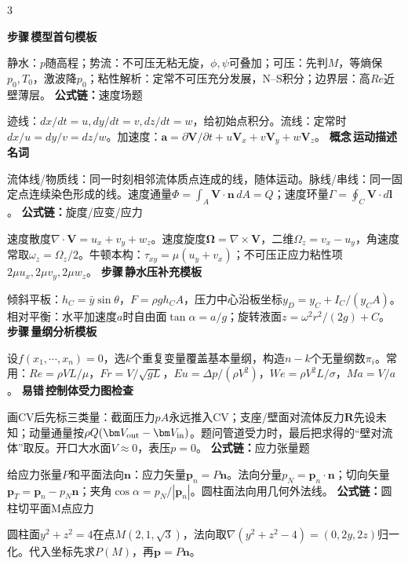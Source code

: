 \documentclass[a4paper]{article}
\newcommand{\form}[1]{{\color{M}\bfseries 公式链：}#1\par}
\newcommand{\labtag}[3]{{\bfseries\color{#1}\colorbox{#1}{\color{white}\fontsize{2.18}{2.28}\selectfont #2}\,#3}\par}
\newcommand{\step}[1]{\labtag{S}{步骤}{#1}}
\newcommand{\err}[1]{\labtag{R}{易错}{#1}}
\newcommand{\concept}[1]{\labtag{V}{概念}{#1}}
\newcommand{\stepq}[1]{\step{#1}}
\newcommand{\formq}[1]{\form{#1}}
\newcommand{\errq}[1]{\err{#1}}
\newcommand{\conceptq}[1]{\concept{#1}}
\newenvironment{vfourWrap}{\par\begingroup\fontsize{2.56}{2.70}\selectfont\setlength{\fboxsep}{0.38pt}}{\par\endgroup}
\begin{document}
\begin{multicols}{3}
\begin{vfourWrap}
\stepq{模型首句模板}
静水：$p$随高程；势流：不可压无粘无旋，$\phi,\psi$可叠加；可压：先判$M$，等熵保$p_0,T_0$，激波降$p_0$；粘性解析：定常不可压充分发展，N--S积分；边界层：高$Re$近壁薄层。
\formq{速度场题}
迹线：$dx/dt=u,dy/dt=v,dz/dt=w$，给初始点积分。流线：定常时$dx/u=dy/v=dz/w$。加速度：$\bm a=\partial\bm V/\partial t+u\bm V_x+v\bm V_y+w\bm V_z$。
\conceptq{运动描述名词}
流体线/物质线：同一时刻相邻流体质点连成的线，随体运动。脉线/串线：同一固定点连续染色形成的线。速度通量$\Phi=\int_A\bm V\cdot\bm n\,dA=Q$；速度环量$\Gamma=\oint_C\bm V\cdot d\bm l$。
\formq{旋度/应变/应力}
速度散度$\nabla\cdot\bm V=u_x+v_y+w_z$。速度旋度$\bm\Omega=\nabla\times\bm V$，二维$\Omega_z=v_x-u_y$，角速度常取$\omega_z=\Omega_z/2$。牛顿本构：$\tau_{xy}=\mu(u_y+v_x)$；不可压正应力粘性项$2\mu u_x,2\mu v_y,2\mu w_z$。
\stepq{静水压补充模板}
倾斜平板：$h_C=\bar y\sin\theta$，$F=\rho gh_CA$，压力中心沿板坐标$y_D=y_C+I_C/(y_CA)$。相对平衡：水平加速度$a$时自由面$\tan\alpha=a/g$；旋转液面$z=\omega^2r^2/(2g)+C$。
\stepq{量纲分析模板}
设$f(x_1,\cdots,x_n)=0$，选$k$个重复变量覆盖基本量纲，构造$n-k$个无量纲数$\pi_i$。常用：$Re=\rho VL/\mu$，$Fr=V/\sqrt{gL}$，$Eu=\Delta p/(\rho V^2)$，$We=\rho V^2L/\sigma$，$Ma=V/a$。
\errq{控制体受力图检查}
画CV后先标三类量：截面压力$pA$永远推入CV；支座/壁面对流体反力$\bm R$先设未知；动量通量按$\rho Q(\bm V_{\rm out}-\bm V_{\rm in})$。题问管道受力时，最后把求得的“壁对流体”取反。开口大水面$V\approx0$，表压$p=0$。
\formq{应力张量题}
给应力张量$P$和平面法向$\bm n$：应力矢量$\bm p_n=P\bm n$。法向分量$p_N=\bm p_n\cdot\bm n$；切向矢量$\bm p_T=\bm p_n-p_N\bm n$；夹角$\cos\alpha=p_N/|\bm p_n|$。圆柱面法向用几何外法线。
\formq{圆柱切平面M点应力}
圆柱面$y^2+z^2=4$在点$M(2,1,\sqrt3)$，法向取$\nabla(y^2+z^2-4)=(0,2y,2z)$归一化。代入坐标先求$P(M)$，再$\bm p=P\bm n$。


\end{vfourWrap}
\end{multicols}
\end{document}
